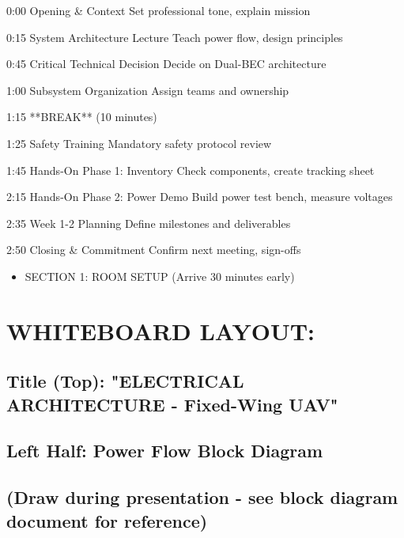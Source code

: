 \documentclass[11pt,letterpaper]{article}
\begin{document}
0:00    Opening \& Context               Set professional tone, explain mission\par

0:15    System Architecture Lecture     Teach power flow, design principles\par

0:45    Critical Technical Decision     Decide on Dual-BEC architecture\par

1:00    Subsystem Organization          Assign teams and ownership\par

1:15    **BREAK** (10 minutes)\par

1:25    Safety Training                 Mandatory safety protocol review\par

1:45    Hands-On Phase 1: Inventory     Check components, create tracking sheet\par

2:15    Hands-On Phase 2: Power Demo    Build power test bench, measure voltages\par

2:35    Week 1-2 Planning               Define milestones and deliverables\par

2:50    Closing \& Commitment            Confirm next meeting, sign-offs\par

\begin{itemize}
  \item SECTION 1: ROOM SETUP (Arrive 30 minutes early)
\end{itemize}

\section{WHITEBOARD LAYOUT:}

\subsection*{Title (Top): "ELECTRICAL ARCHITECTURE - Fixed-Wing UAV"}

\subsection*{Left Half: Power Flow Block Diagram}

\subsection*{(Draw during presentation - see block diagram document for reference)}
\end{document}

